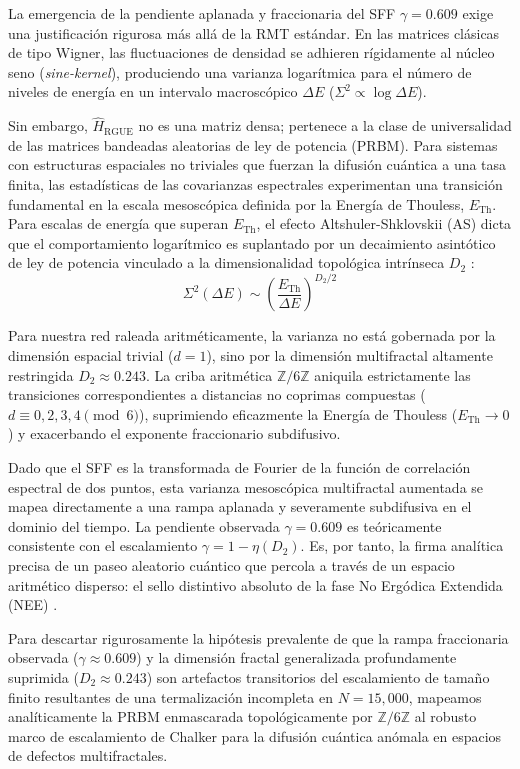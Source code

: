 \documentclass[aps,prl,preprint,superscriptaddress,floatfix]{revtex4-2}
\newcommand{\Zmod}{\mathbb{Z}/6\mathbb{Z}}
\begin{document}
La emergencia de la pendiente aplanada y fraccionaria del SFF $\gamma = 0.609$ exige una justificación rigurosa más allá de la RMT estándar. En las matrices clásicas de tipo Wigner, las fluctuaciones de densidad se adhieren rígidamente al núcleo seno (\textit{sine-kernel}), produciendo una varianza logarítmica para el número de niveles de energía en un intervalo macroscópico $\Delta E$ ($\Sigma^2 \propto \log \Delta E$).

Sin embargo, $\hat{H}_{\text{RGUE}}$ no es una matriz densa; pertenece a la clase de universalidad de las matrices bandeadas aleatorias de ley de potencia (PRBM). Para sistemas con estructuras espaciales no triviales que fuerzan la difusión cuántica a una tasa finita, las estadísticas de las covarianzas espectrales experimentan una transición fundamental en la escala mesoscópica definida por la Energía de Thouless, $E_{\text{Th}}$. Para escalas de energía que superan $E_{\text{Th}}$, el efecto Altshuler-Shklovskii (AS) dicta que el comportamiento logarítmico es suplantado por un decaimiento asintótico de ley de potencia vinculado a la dimensionalidad topológica intrínseca $D_2$ \cite{Erdos2013, Erdos2015}:
\begin{equation}
\Sigma^2(\Delta E) \sim \left( \frac{E_{\text{Th}}}{\Delta E} \right)^{D_2/2}
\end{equation}

Para nuestra red raleada aritméticamente, la varianza no está gobernada por la dimensión espacial trivial ($d=1$), sino por la dimensión multifractal altamente restringida $D_2 \approx 0.243$. La criba aritmética $\Zmod$ aniquila estrictamente las transiciones correspondientes a distancias no coprimas compuestas ($d \equiv 0,2,3,4 \pmod 6$), suprimiendo eficazmente la Energía de Thouless ($E_{\text{Th}} \to 0$) y exacerbando el exponente fraccionario subdifusivo.

Dado que el SFF es la transformada de Fourier de la función de correlación espectral de dos puntos, esta varianza mesoscópica multifractal aumentada se mapea directamente a una rampa aplanada y severamente subdifusiva en el dominio del tiempo. La pendiente observada $\gamma = 0.609$ es teóricamente consistente con el escalamiento $\gamma = 1 - \eta(D_2)$. Es, por tanto, la firma analítica precisa de un paseo aleatorio cuántico que percola a través de un espacio aritmético disperso: el sello distintivo absoluto de la fase No Ergódica Extendida (NEE) \cite{Kravtsov2015, Khaymovich2020, GarciaGarcia2024}.

Para descartar rigurosamente la hipótesis prevalente de que la rampa fraccionaria observada ($\gamma \approx 0.609$) y la dimensión fractal generalizada profundamente suprimida ($D_2 \approx 0.243$) son artefactos transitorios del escalamiento de tamaño finito resultantes de una termalización incompleta en $N=15,000$, mapeamos analíticamente la PRBM enmascarada topológicamente por $\Zmod$ al robusto marco de escalamiento de Chalker para la difusión cuántica anómala en espacios de defectos multifractales.
\end{document}
